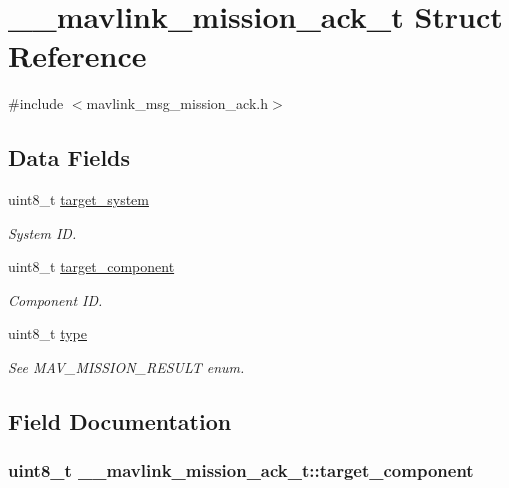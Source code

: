 \hypertarget{struct____mavlink__mission__ack__t}{\section{\+\_\+\+\_\+mavlink\+\_\+mission\+\_\+ack\+\_\+t Struct Reference}
\label{struct____mavlink__mission__ack__t}
}


{\ttfamily \#include $<$mavlink\+\_\+msg\+\_\+mission\+\_\+ack.\+h$>$}

\subsection*{Data Fields}
\begin{DoxyCompactItemize}
\item 
uint8\+\_\+t \hyperlink{struct____mavlink__mission__ack__t_ab8ef2eb9bff8975de92406b94c18d907}{target\+\_\+system}
\begin{DoxyCompactList}\small\item\em System I\+D. \end{DoxyCompactList}\item 
uint8\+\_\+t \hyperlink{struct____mavlink__mission__ack__t_ab254af31fbc3e92ab8cffcea8bd78fba}{target\+\_\+component}
\begin{DoxyCompactList}\small\item\em Component I\+D. \end{DoxyCompactList}\item 
uint8\+\_\+t \hyperlink{struct____mavlink__mission__ack__t_ad05f998d3b1bea0480eb25dcb82e0c92}{type}
\begin{DoxyCompactList}\small\item\em See M\+A\+V\+\_\+\+M\+I\+S\+S\+I\+O\+N\+\_\+\+R\+E\+S\+U\+L\+T enum. \end{DoxyCompactList}\end{DoxyCompactItemize}


\subsection{Field Documentation}
\hypertarget{struct____mavlink__mission__ack__t_ab254af31fbc3e92ab8cffcea8bd78fba}{
\subsubsection[{target\+\_\+component}]{\setlength{\rightskip}{0pt plus 5cm}uint8\+\_\+t \+\_\+\+\_\+mavlink\+\_\+mission\+\_\+ack\+\_\+t\+::target\+\_\+component}}\label{struct____mavlink__mission__ack__t_ab254af31fbc3e92ab8cffcea8bd78fba}


